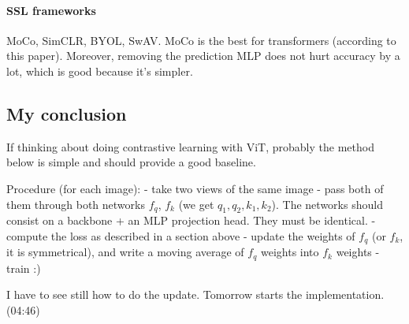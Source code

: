 \documentclass[
]{article}
\begin{document}
\hypertarget{ssl-frameworks}{%
\paragraph{SSL frameworks}\label{ssl-frameworks}}

MoCo, SimCLR, BYOL, SwAV. MoCo is the best for transformers (according
to this paper). Moreover, removing the prediction MLP does not hurt
accuracy by a lot, which is good because it's simpler.

\hypertarget{my-conclusion}{%
\subsection{My conclusion}\label{my-conclusion}}

If thinking about doing contrastive learning with ViT, probably the
method below is simple and should provide a good baseline.

Procedure (for each image): - take two views of the same image - pass
both of them through both networks \(f_q\), \(f_k\) (we get
\(q_1, q_2, k_1, k_2\)). The networks should consist on a backbone + an
MLP projection head. They must be identical. - compute the loss as
described in a section above - update the weights of \(f_q\) (or
\(f_k\), it is symmetrical), and write a moving average of \(f_q\)
weights into \(f_k\) weights - train :)

I have to see still how to do the update. Tomorrow starts the
implementation. (04:46)
\end{document}
